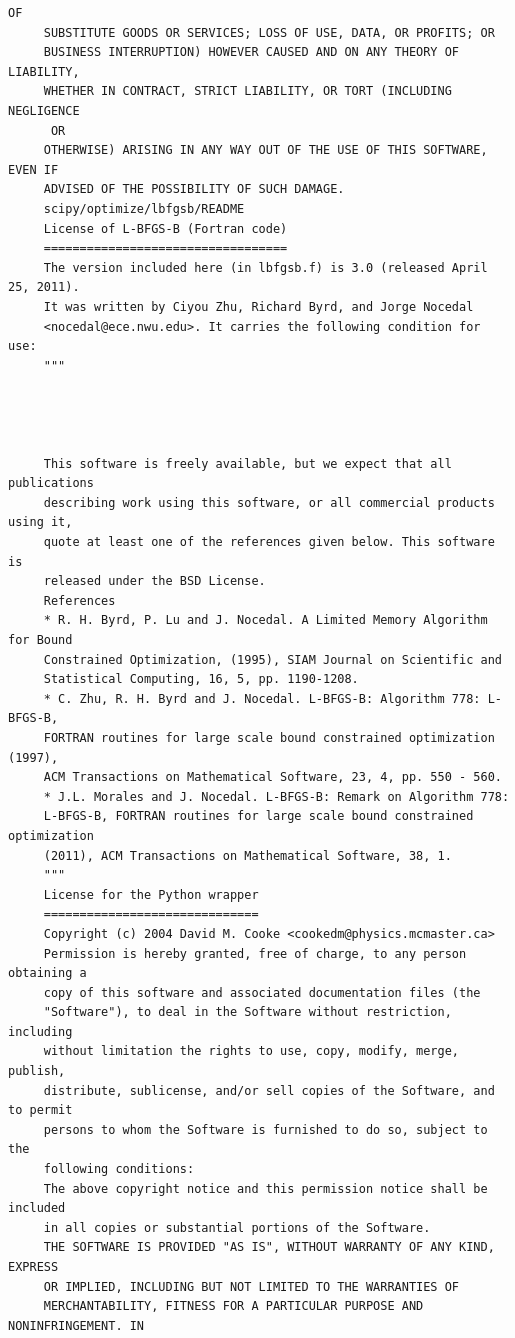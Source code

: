 \begin{lstlisting}[basicstyle=\ttfamily\footnotesize,breaklines=true]
      OF
     SUBSTITUTE GOODS OR SERVICES; LOSS OF USE, DATA, OR PROFITS; OR
     BUSINESS INTERRUPTION) HOWEVER CAUSED AND ON ANY THEORY OF LIABILITY,
     WHETHER IN CONTRACT, STRICT LIABILITY, OR TORT (INCLUDING NEGLIGENCE
      OR
     OTHERWISE) ARISING IN ANY WAY OUT OF THE USE OF THIS SOFTWARE, EVEN IF
     ADVISED OF THE POSSIBILITY OF SUCH DAMAGE.
     scipy/optimize/lbfgsb/README
     License of L-BFGS-B (Fortran code)
     ==================================
     The version included here (in lbfgsb.f) is 3.0 (released April 25, 2011).
     It was written by Ciyou Zhu, Richard Byrd, and Jorge Nocedal
     <nocedal@ece.nwu.edu>. It carries the following condition for use:
     """




     This software is freely available, but we expect that all publications
     describing work using this software, or all commercial products using it,
     quote at least one of the references given below. This software is
     released under the BSD License.
     References
     * R. H. Byrd, P. Lu and J. Nocedal. A Limited Memory Algorithm for Bound
     Constrained Optimization, (1995), SIAM Journal on Scientific and
     Statistical Computing, 16, 5, pp. 1190-1208.
     * C. Zhu, R. H. Byrd and J. Nocedal. L-BFGS-B: Algorithm 778: L-BFGS-B,
     FORTRAN routines for large scale bound constrained optimization (1997),
     ACM Transactions on Mathematical Software, 23, 4, pp. 550 - 560.
     * J.L. Morales and J. Nocedal. L-BFGS-B: Remark on Algorithm 778:
     L-BFGS-B, FORTRAN routines for large scale bound constrained optimization
     (2011), ACM Transactions on Mathematical Software, 38, 1.
     """
     License for the Python wrapper
     ==============================
     Copyright (c) 2004 David M. Cooke <cookedm@physics.mcmaster.ca>
     Permission is hereby granted, free of charge, to any person obtaining a
     copy of this software and associated documentation files (the
     "Software"), to deal in the Software without restriction, including
     without limitation the rights to use, copy, modify, merge, publish,
     distribute, sublicense, and/or sell copies of the Software, and to permit
     persons to whom the Software is furnished to do so, subject to the
     following conditions:
     The above copyright notice and this permission notice shall be included
     in all copies or substantial portions of the Software.
     THE SOFTWARE IS PROVIDED "AS IS", WITHOUT WARRANTY OF ANY KIND, EXPRESS
     OR IMPLIED, INCLUDING BUT NOT LIMITED TO THE WARRANTIES OF
     MERCHANTABILITY, FITNESS FOR A PARTICULAR PURPOSE AND NONINFRINGEMENT. IN

\end{lstlisting}
